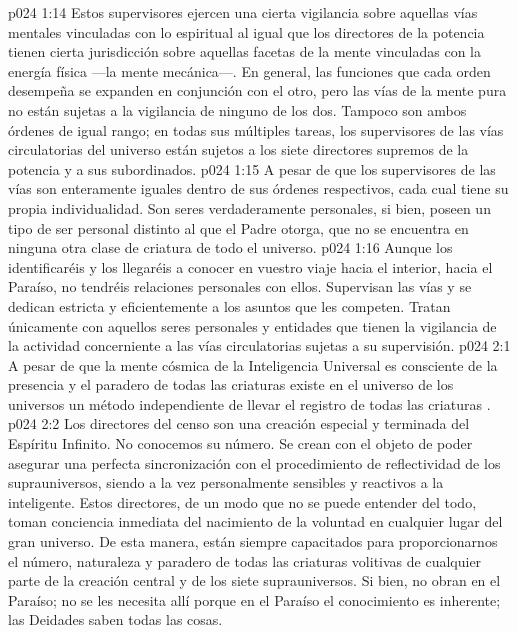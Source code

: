 \vs p024 1:14 Estos supervisores ejercen una cierta vigilancia sobre aquellas vías mentales vinculadas con lo espiritual al igual que los directores de la potencia tienen cierta jurisdicción sobre aquellas facetas de la mente vinculadas con la energía física ---la mente mecánica---. En general, las funciones que cada orden desempeña se expanden en conjunción con el otro, pero las vías de la mente pura no están sujetas a la vigilancia de ninguno de los dos. Tampoco son ambos órdenes de igual rango; en todas sus múltiples tareas, los supervisores de las vías circulatorias del universo están sujetos a los siete directores supremos de la potencia y a sus subordinados.
\vs p024 1:15 \pc A pesar de que los supervisores de las vías son enteramente iguales dentro de sus órdenes respectivos, cada cual tiene su propia individualidad. Son seres verdaderamente personales, si bien, poseen un tipo de ser personal distinto al que el Padre otorga, que no se encuentra en ninguna otra clase de criatura de todo el universo.
\vs p024 1:16 Aunque los identificaréis y los llegaréis a conocer en vuestro viaje hacia el interior, hacia el Paraíso, no tendréis relaciones personales con ellos. Supervisan las vías y se dedican estricta y eficientemente a los asuntos que les competen. Tratan únicamente con aquellos seres personales y entidades que tienen la vigilancia de la actividad concerniente a las vías circulatorias sujetas a su supervisión.
\vs p024 2:1 A pesar de que la mente cósmica de la Inteligencia Universal es consciente de la presencia y el paradero de todas las criaturas  existe en el universo de los universos un método independiente de llevar el registro de todas las criaturas .
\vs p024 2:2 Los directores del censo son una creación especial y terminada del Espíritu Infinito. No conocemos su número. Se crean con el objeto de poder asegurar una perfecta sincronización con el procedimiento de reflectividad de los suprauniversos, siendo a la vez personalmente sensibles y reactivos a la  inteligente. Estos directores, de un modo que no se puede entender del todo, toman conciencia inmediata del nacimiento de la voluntad en cualquier lugar del gran universo. De esta manera, están siempre capacitados para proporcionarnos el número, naturaleza y paradero de todas las criaturas volitivas de cualquier parte de la creación central y de los siete suprauniversos. Si bien, no obran en el Paraíso; no se les necesita allí porque en el Paraíso el conocimiento es inherente; las Deidades saben todas las cosas.
